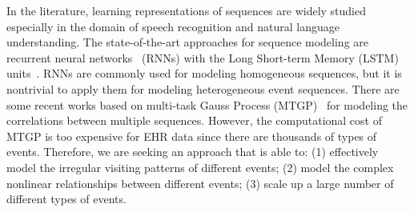 \documentclass[letterpaper]{article} %
\begin{document}
In the literature, learning representations of sequences are widely studied especially in the domain of speech recognition and natural language understanding. The state-of-the-art approaches for sequence modeling are recurrent neural networks~\cite{mikolov2010recurrent} (RNNs) with the Long Short-term Memory (LSTM) units~\cite{hochreiter1997long}. RNNs are commonly used for modeling homogeneous sequences, but it is nontrivial to apply them for modeling heterogeneous event sequences. There are some recent works based on multi-task Gauss Process (MTGP)~\cite{ghassemi2015multivariate} for modeling the correlations between multiple sequences. However, the computational cost of MTGP is too expensive for EHR data since there are thousands of types of events. Therefore, we are seeking an approach that is able to: (1) effectively model the irregular visiting patterns of different events; (2) model the complex nonlinear relationships between different events; (3) scale up a large number of different types of events. 





\end{document}

